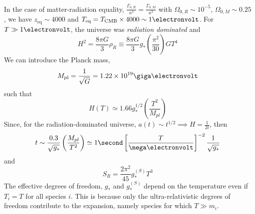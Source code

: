 \documentclass[a4paper,twoside,master.tex]{subfiles}
\begin{document}
In the case of matter-radiation equality, $ \frac{\Gamma_{0,R}}{a^4} = \frac{\Gamma_{0,M}}{a^3} $ with $ \Omega_{0,R} \sim 10^{-5} $, $ \Omega_{0,M} \sim 0.25 $, we have $ z_{\text{eq}} \sim 4000 $ and $ T_{\text{eq}} = T_{\text{CMB}} \times 4000 \sim 1\electronvolt $. For $ T\gg 1\electronvolt $, the universe was \textit{radiation dominated} and
\begin{equation}
    H^2 = \frac{8 \pi G}{3} \rho_R \equiv \frac{8 \pi G}{3} g_* \left( \frac{\pi^2}{30} \right) G T^4
\end{equation}
We can introduce the Planck mass,
\begin{equation}
    M_{\text{pl}} = \frac{1}{\sqrt{G}} = 1.22 \times 10^{19} \giga\electronvolt 
\end{equation}
such that
\begin{equation}
    H(T) \simeq 1.66 g_*^{1/2} \left( \frac{T^2}{M_{pl}} \right)
\end{equation}
Since, for the radiation-dominated universe, $ a(t) \sim t^{1/2} \implies H = \frac{1}{2t} $, then
\begin{equation}
    t \sim \frac{0.3}{\sqrt{g_*}} \left( \frac{M_{pl}}{T^2} \right) \simeq 1\second \left[ \frac{T}{\mega\electronvolt} \right]^{-2} \frac{1}{\sqrt{g_*}}
\end{equation}
and
\begin{equation}
    S_R = \frac{2 \pi^2}{45} g_*^{(S)} T^3
\end{equation}
The effective degrees of freedom, $ g_* $ and $ g_*^{(S)} $ depend on the temperature even if $ T_i = T $ for all species $ i $. This is because only the ultra-relativistic degrees of freedom contribute to the expansion, namely species for which $ T \gg m_i $.
\end{document}
